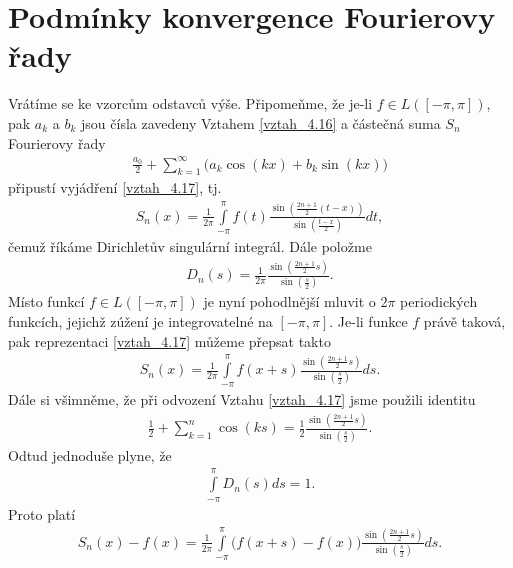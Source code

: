 \section{Podmínky konvergence Fourierovy řady}

Vrátíme se ke vzorcům odstavců výše. Připomeňme, že je-li $f \in L([-\pi, \pi])$, pak $a_k$ a $b_k$ jsou čísla zavedeny Vztahem \eqref{vztah_4.16} a částečná suma $S_n$ Fourierovy řady 
\begin{align*}
\frac{a_0}{2} + \sum \limits _{k=1}^\infty \Big(a_k \cos (kx) + b_k \sin (kx)\Big)
\end{align*}
připustí vyjádření \eqref{vztah_4.17}, tj.
\begin{align*}
S_n (x) = \frac{1}{2 \pi} \int \limits_{-\pi}^\pi f(t) \frac{\sin \left( \frac{2n + 1}{2} (t-x) \right)}{\sin \left( \frac{t-x}{2} \right)} dt,
\end{align*}
čemuž říkáme Dirichletův singulární integrál. Dále položme
\begin{align*}
D_n (s) = \frac{1}{2 \pi} \frac{\sin \left( \frac{2n + 1}{2} s \right)}{\sin \left( \frac{s}{2}\right)}.
\end{align*}
Místo funkcí $f \in L([-\pi, \pi])$ je nyní pohodlnější mluvit o $2 \pi$ periodických funkcích, jejichž zúžení je integrovatelné na $[-\pi, \pi]$. Je-li funkce $f$ právě taková, pak reprezentaci \eqref{vztah_4.17} můžeme přepsat takto
\begin{align*}
S_n (x) = \frac{1}{2 \pi} \int \limits_{-\pi}^\pi f (x + s) \frac{\sin \left( \frac{2n + 1}{2} s\right)}{\sin \left( \frac{s}{2} \right)} ds.
\end{align*}
Dále si všimněme, že při odvození Vztahu \eqref{vztah_4.17} jsme použili identitu
\begin{align*}
\frac{1}{2} + \sum \limits _{k=1}^n \cos (ks) = \frac{1}{2} \frac{\sin \left( \frac{2n + 1}{2} s \right)}{\sin \left( \frac{s}{2} \right)}.
\end{align*}
Odtud jednoduše plyne, že
\begin{align*}
\int \limits_{-\pi}^\pi D_n (s) ds = 1.
\end{align*}
Proto platí
\begin{align}\label{vztah_4.28}
S_n (x) - f (x) = \frac{1}{2\pi} \int \limits_{-\pi}^\pi \Big(f (x + s) - f (x)\Big) \frac{\sin \left( \frac{2n + 1}{2} s \right)}{\sin \left( \frac{s}{2} \right)} ds.
\end{align}

